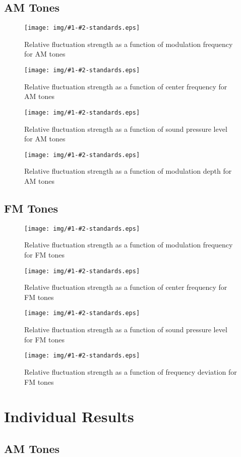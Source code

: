 \documentclass[a4paper]{article}
\newcommand{\figStds}[3]{
\begin{figure}[ht!]
  \centering
  \texttt{[image: img/\#1-\#2-standards.eps]}
  \caption{#3}
\label{fig:#1-#2}
\end{figure}
}
\begin{document}
\subsection{AM Tones} %
\label{subsec:results_am_tones}

\figStds{AM-fm}
  {All}
  {Relative fluctuation strength as a function of modulation frequency for AM
  tones}

\figStds{AM-fc}
  {All}
  {Relative fluctuation strength as a function of center frequency for AM
  tones}

\figStds{AM-SPL}
  {All}
  {Relative fluctuation strength as a function of sound pressure level for AM
  tones}

\figStds{AM-md}
  {All}
  {Relative fluctuation strength as a function of modulation depth for AM
  tones}


\subsection{FM Tones} %
\label{subsec:results_fm_tones}

\figStds{FM-fm}
  {All}
  {Relative fluctuation strength as a function of modulation frequency for FM
  tones}

\figStds{FM-fc}
  {All}
  {Relative fluctuation strength as a function of center frequency for FM
  tones}

\figStds{FM-SPL}
  {All}
  {Relative fluctuation strength as a function of sound pressure level for FM
  tones}

\figStds{FM-df}
  {All}
  {Relative fluctuation strength as a function of frequency deviation for FM
  tones}



\clearpage

\appendix

\section{Individual Results} %
\label{sec:individual_results}

\subsection{AM Tones} %
\label{subsec:individual_results_am_tones}
\end{document}

